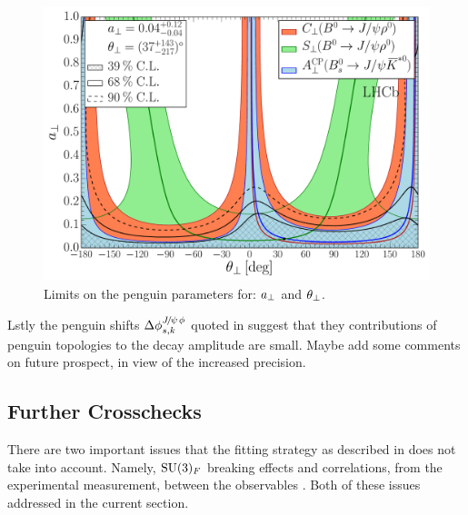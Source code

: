 \begin{figure}[!t]
  \centering
  \includegraphics[trim=0.0cm 0.0cm 0.0cm 0.0cm, clip=true,scale=0.33]{Figures/Chapter5/Penguin_Contribution_Ang_vs_Abs_allB2VV_Perp.pdf}
  \caption{Limits on the penguin parameters for: $a_{\perp}$ and $\theta_{\perp}$.}
  \label{pengPlot_perp}
\end{figure}


Lstly the penguin shifts $\Delta\phi^{{J\mskip -3mu/\mskip -2mu\psi\mskip 2mu}\phi}_{s,{k}}$ quoted in 
suggest that they contributions of penguin topologies to the \BsJpsiPhi decay amplitude are small.
{\color{red} Maybe add some comments on future prospect, in view of the increased precision.}

\subsection{Further Crosschecks}
There are two important issues that the fitting strategy as described in 
does not take into account. Namely, $\mathrm{SU}(3)_F$ breaking effects and correlations, from the
experimental measurement, between the observables . Both of these issues
addressed in the current section.

